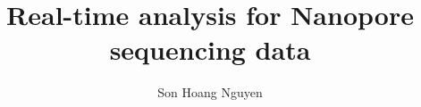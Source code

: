 \title{
Real-time analysis for Nanopore sequencing data}
\author{Son Hoang Nguyen}



\titlepage



\tableofcontents
\listoffigures
\listoftables

